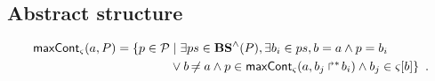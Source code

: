 \subsection{Abstract structure}

\begin{definition}[$\gCont_\ctx : \Sigma \times \Obj \mapsto \powerset(\Proc)$]
  \label{def:maxCont}
  \begin{align*}
    \mathsf{maxCont}_\varsigma(a,P) = 
    \{ p \in \mathcal{P} &\mid \exists ps \in \mathbf{BS}^\wedge(P), \exists b_i \in ps, b = a \wedge p = b_i \\
      & \vee b \not\nobreak\mkern -2mu = a \wedge p \in \mathsf{maxCont}_\varsigma(a, \mbox{$b_j\Rsh^*\!b_i$}) \wedge b_j \in {\varsigma[b]} \}
    \enspace.
  \end{align*}
\end{definition}

